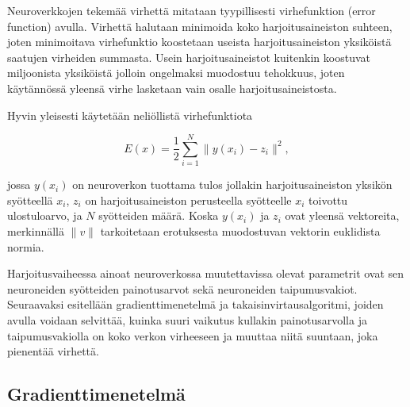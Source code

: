 \documentclass[finnish]{tktltiki2}
\theoremstyle{definition}
\theoremstyle{remark}
\begin{document}
  Neuroverkkojen tekemää virhettä mitataan tyypillisesti virhefunktion (error function) avulla. Virhettä halutaan minimoida koko harjoitusaineiston suhteen, joten minimoitava virhefunktio koostetaan useista harjoitusaineiston yksiköistä saatujen virheiden summasta. Usein harjoitusaineistot kuitenkin koostuvat miljoonista yksiköistä jolloin ongelmaksi muodostuu tehokkuus, joten käytännössä yleensä virhe lasketaan vain osalle harjoitusaineistosta.

   Hyvin yleisesti käytetään neliöllistä virhefunktiota

  \begin{equation}
    E(x) = \frac{1}{2} \sum_{i=1}^{N} \| y(x_i) - z_i \|^2,
    \label{eq:error-function}
  \end{equation}

  jossa $y(x_i)$ on neuroverkon tuottama tulos jollakin harjoitusaineiston yksikön syötteellä $x_i$, $z_i$ on harjoitusaineiston perusteella syötteelle $x_i$ toivottu ulostuloarvo, ja $N$ syötteiden määrä. Koska $y(x_i)$ ja $z_i$ ovat yleensä vektoreita, merkinnällä $\|v\|$ tarkoitetaan erotuksesta muodostuvan vektorin euklidista normia.

  Harjoitusvaiheessa ainoat neuroverkossa muutettavissa olevat parametrit ovat sen neuroneiden syötteiden painotusarvot sekä neuroneiden taipumusvakiot. Seuraavaksi esitellään gradienttimenetelmä ja takaisinvirtausalgoritmi, joiden avulla voidaan selvittää, kuinka suuri vaikutus kullakin painotusarvolla ja taipumusvakiolla on koko verkon virheeseen ja muuttaa niitä suuntaan, joka pienentää virhettä.



  \subsection{Gradienttimenetelmä}
    \label{chap:backprop}
\end{document}
